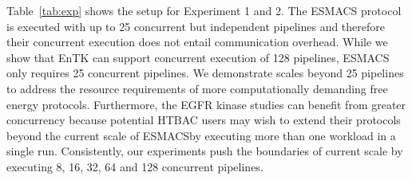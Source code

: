\documentclass{bmcart}
\begin{document}
Table~\ref{tab:exp} shows the setup for Experiment 1 and 2. The ESMACS
protocol is executed with up to 25 concurrent but independent pipelines and
therefore their concurrent execution does not entail communication overhead. While 
we show that EnTK can support concurrent execution of 128 pipelines, ESMACS only 
requires 25 concurrent pipelines. We demonstrate scales beyond 25 pipelines to 
address the resource requirements of more computationally demanding free energy
protocols. Furthermore, the EGFR kinase studies can benefit 
from greater concurrency because potential HTBAC users may wish to extend their 
protocols beyond the current scale of ESMACS\@ by executing more than one 
workload in a single run. Consistently, our experiments 
push the boundaries of current scale by executing 8, 16, 32, 64 and 128 
concurrent pipelines.


\end{document}
